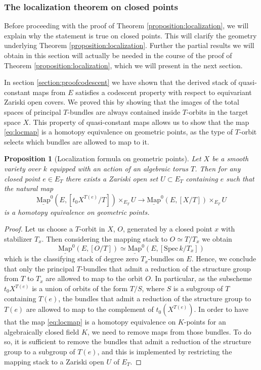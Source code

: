 \documentclass[11pt,letterpaper]{amsart}
\newtheorem{proposition}[dummy]{Proposition}
\newtheorem{remark}[dummy]{Remark}
\newcommand{\Mapo}[2]{\underline{\mathrm{Map}}^{0}\left (#1,#2\right )}
\newcommand{\Spec}{\mathrm{S}\mathrm{pec}\,}
\begin{document}
\subsubsection{The localization theorem on closed points}
\label{remark:bijonpoints}
Before proceeding with the proof of Theorem \ref{proposition:localization}, we will explain why the statement is true on closed points. This will clarify the geometry underlying Theorem \ref{proposition:localization}. Further the partial results we will obtain in this section will actually be needed in the course of the proof of Theorem \ref{proposition:localization}, which we will present in the next section.

In section \ref{section:proofcodescent} we have shown  that the derived stack of quasi-constant maps from $E$ satisfies a codescent property with respect to equivariant Zariski open covers. We  proved this by showing that the images of the total spaces of principal $T$-bundles are always contained inside $T$-orbits in the target space $X$. This property of quasi-constant maps allows us to show that the map \eqref{eq:locmap} is a homotopy equivalence on geometric points, as the type of $T$-orbit selects which bundles are allowed to map to it. 

\begin{proposition}[Localization formula on geometric points]\label{remark:bijonpoints}
Let $X$ be a smooth variety over $k$ equipped with an action of an algebraic torus $T$. Then for any closed point $e\in E_T$ there exists a Zariski open set $U\subset E_T$ containing $e$ such that the natural map
\begin{equation}\label{eq:locmap}
\Mapo{E}{[t_0 X^{T(e)}/T]}\times_{E_T} U   \rightarrow\Mapo{E}{[X/T]}\times_{E_T} U
\end{equation}
is a homotopy equivalence on geometric points.
\end{proposition}
\begin{proof}
Let us choose a $T$-orbit in $X$, $O$, generated by a closed point $x$ with stabilizer $T_x$. Then considering the mapping stack to $O\simeq T/T_x$ we obtain
\begin{equation*}
\Mapo{E}{[O/T]}\simeq\Mapo{E}{[\Spec k/T_x]}
\end{equation*}
which is the classifying stack of degree zero $T_x$-bundles on $E$. Hence, we conclude that only the principal $T$-bundles that admit a reduction of the structure group from $T$ to $T_x$ are allowed to map to the orbit $O$. In particular, as the subscheme $t_0 X^{T(e)}$ is a union of orbits of the form $T/S$, where $S$ is a subgroup of $T$ containing $T(e)$, the bundles that admit a reduction of the structure group to $T(e)$ are allowed to map to the complement of $t_0(X^{T(e)})$. 
In order to have that the map \eqref{eq:locmap} is a homotopy equivalence on $K$-points for an algebraically closed field $K$, we need to remove maps from those bundles. To do so, it is sufficient to remove the bundles that admit a reduction of the structure group to a subgroup of $T(e)$, and this is implemented by restricting the mapping stack to a Zariski open $U$ of $E_T$.
\end{proof}
 
\end{document}

